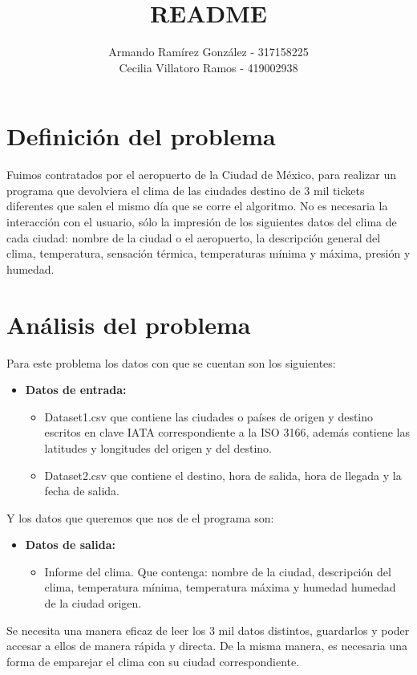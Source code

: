 \documentclass[]{article}
\title{README}
\author{Armando Ramírez González - 317158225 \\ Cecilia Villatoro Ramos - 419002938}
\begin{document}
\maketitle

\section{Definición del problema}
Fuimos contratados por el aeropuerto de la Ciudad de México, para realizar un programa que devolviera el clima de las ciudades destino de 3 mil tickets diferentes que salen el mismo día que se corre el algoritmo. No es necesaria la interacción con el usuario, sólo la impresión de los siguientes datos del clima de cada ciudad: nombre de la ciudad o el aeropuerto, la descripción general del clima, temperatura, sensación térmica, temperaturas mínima y máxima, presión y humedad.


\section{Análisis del problema}
Para este problema los datos con que se cuentan son los siguientes:
\begin{itemize}
	\item \textbf{Datos de entrada:}
	\begin{itemize}
		\item Dataset1.csv que contiene las ciudades o países de origen y destino escritos en clave IATA correspondiente a la ISO 3166, además contiene las latitudes y longitudes del origen y del destino.		
		\item Dataset2.csv que contiene el destino, hora de salida, hora de llegada y la fecha de salida.
	\end{itemize}
\end{itemize}

Y los datos que queremos que nos de el programa son:
\begin{itemize}
	\item \textbf{Datos de salida:}
	\begin{itemize}
		\item Informe del clima. Que contenga: nombre de la ciudad, descripción del clima, temperatura mínima, temperatura máxima y humedad humedad de la ciudad origen.
	\end{itemize}
\end{itemize}

Se necesita una manera eficaz de leer los 3 mil datos distintos, guardarlos y 
poder accesar a ellos de manera rápida y directa. De la misma manera, es 
necesaria una forma de emparejar el clima con su ciudad correspondiente.
\end{document}
